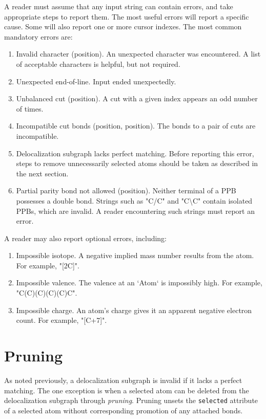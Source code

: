 \documentclass{article}
\def\ttt{\texttt}
\begin{document}
A reader must assume that any input string can contain errors, and take appropriate steps to report them. The most useful errors will report a specific cause. Some will also report one or more cursor indexes. The most common mandatory errors are:

\begin{enumerate}
    \item{Invalid character (position). An unexpected character was encountered. A list of acceptable characters is helpful, but not required.}
    \item{Unexpected end-of-line. Input ended unexpectedly.}
    \item{Unbalanced cut (position). A cut with a given index appears an odd number of times.}
    \item{Incompatible cut bonds (position, position). The bonds to a pair of cuts are incompatible.}
    \item{Delocalization subgraph lacks perfect matching. Before reporting this error, steps to remove unnecessarily selected atoms should be taken as described in the next section.}
    \item{Partial parity bond not allowed (position). Neither terminal of a PPB possesses a double bond. Strings such as "C/C" and "C{\textbackslash}C" contain isolated PPBs, which are invalid. A reader encountering such strings must report an error.}
\end{enumerate}

A reader may also report optional errors, including:

\begin{enumerate}
    \item{Impossible isotope. A negative implied mass number results from the atom. For example, "[2C]".}
    \item{Impossible valence. The valence at an `Atom` is impossibly high. For example, "C(C)(C)(C)(C)C".}
    \item{Impossible charge. An atom's charge gives it an apparent negative electron count. For example, "[C+7]".}
\end{enumerate}

\section*{Pruning}

As noted previously, a delocalization subgraph is invalid if it lacks a perfect matching. The one exception is when a selected atom can be deleted from the delocalization subgraph through \textit{pruning}. Pruning unsets the \ttt{selected} attribute of a selected atom without corresponding promotion of any attached bonds.
\end{document}

